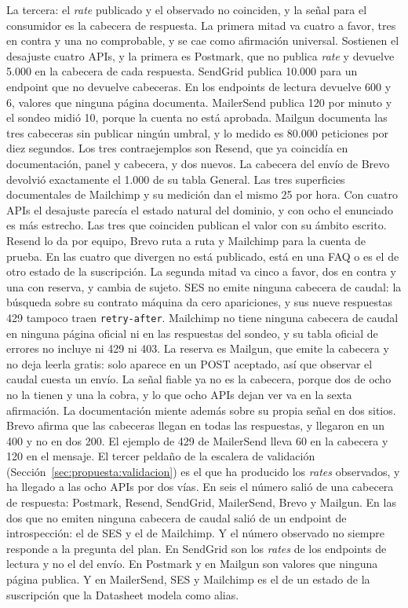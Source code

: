 La tercera: el \textit{rate} publicado y el observado no coinciden, y la señal para el consumidor es la cabecera de respuesta.
La primera mitad va cuatro a favor, tres en contra y una no comprobable, y se cae como afirmación universal.
Sostienen el desajuste cuatro APIs, y la primera es Postmark, que no publica \textit{rate} y devuelve 5.000 en la cabecera de cada respuesta.
SendGrid publica 10.000 para un endpoint que no devuelve cabeceras.
En los endpoints de lectura devuelve 600 y 6, valores que ninguna página documenta.
MailerSend publica 120 por minuto y el sondeo midió 10, porque la cuenta no está aprobada.
Mailgun documenta las tres cabeceras sin publicar ningún umbral, y lo medido es 80.000 peticiones por diez segundos.
Los tres contraejemplos son Resend, que ya coincidía en documentación, panel y cabecera, y dos nuevos.
La cabecera del envío de Brevo devolvió exactamente el 1.000 de su tabla General.
Las tres superficies documentales de Mailchimp y su medición dan el mismo 25 por hora.
Con cuatro APIs el desajuste parecía el estado natural del dominio, y con ocho el enunciado es más estrecho.
Las tres que coinciden publican el valor con su ámbito escrito. Resend lo da por equipo, Brevo ruta a ruta y Mailchimp para la cuenta de prueba. En las cuatro que divergen no está publicado, está en una FAQ o es el de otro estado de la suscripción.
La segunda mitad va cinco a favor, dos en contra y una con reserva, y cambia de sujeto.
SES no emite ninguna cabecera de caudal: la búsqueda sobre su contrato máquina da cero apariciones, y sus nueve respuestas 429 tampoco traen \texttt{retry-after}.
Mailchimp no tiene ninguna cabecera de caudal en ninguna página oficial ni en las respuestas del sondeo, y su tabla oficial de errores no incluye ni 429 ni 403.
La reserva es Mailgun, que emite la cabecera y no deja leerla gratis: solo aparece en un POST aceptado, así que observar el caudal cuesta un envío.
La señal fiable ya no es la cabecera, porque dos de ocho no la tienen y una la cobra, y lo que ocho APIs dejan ver va en la sexta afirmación.
La documentación miente además sobre su propia señal en dos sitios.
Brevo afirma que las cabeceras llegan en todas las respuestas, y llegaron en un 400 y no en dos 200.
El ejemplo de 429 de MailerSend lleva 60 en la cabecera y 120 en el mensaje.
El tercer peldaño de la escalera de validación (Sección~\ref{sec:propuesta:validacion}) es el que ha producido los \textit{rates} observados, y ha llegado a las ocho APIs por dos vías.
En seis el número salió de una cabecera de respuesta: Postmark, Resend, SendGrid, MailerSend, Brevo y Mailgun.
En las dos que no emiten ninguna cabecera de caudal salió de un endpoint de introspección: el de SES y el de Mailchimp.
Y el número observado no siempre responde a la pregunta del plan.
En SendGrid son los \textit{rates} de los endpoints de lectura y no el del envío.
En Postmark y en Mailgun son valores que ninguna página publica.
Y en MailerSend, SES y Mailchimp es el de un estado de la suscripción que la Datasheet modela como alias.


